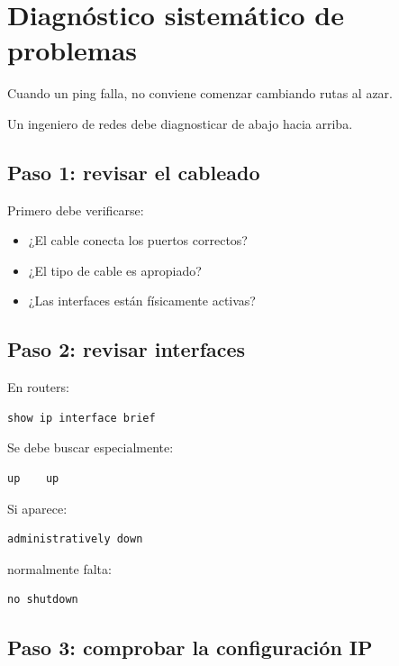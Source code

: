 \documentclass[12pt]{article}
\begin{document}
\section{Diagnóstico sistemático de problemas}

Cuando un ping falla, no conviene comenzar cambiando rutas al azar.

Un ingeniero de redes debe diagnosticar de abajo hacia arriba.


\subsection{Paso 1: revisar el cableado}

Primero debe verificarse:

\begin{itemize}
    \item ¿El cable conecta los puertos correctos?
    \item ¿El tipo de cable es apropiado?
    \item ¿Las interfaces están físicamente activas?
\end{itemize}


\subsection{Paso 2: revisar interfaces}

En routers:

\begin{lstlisting}
show ip interface brief
\end{lstlisting}

Se debe buscar especialmente:

\begin{lstlisting}
up    up
\end{lstlisting}

Si aparece:

\begin{lstlisting}
administratively down
\end{lstlisting}

normalmente falta:

\begin{lstlisting}
no shutdown
\end{lstlisting}


\subsection{Paso 3: comprobar la configuración IP}
\end{document}
